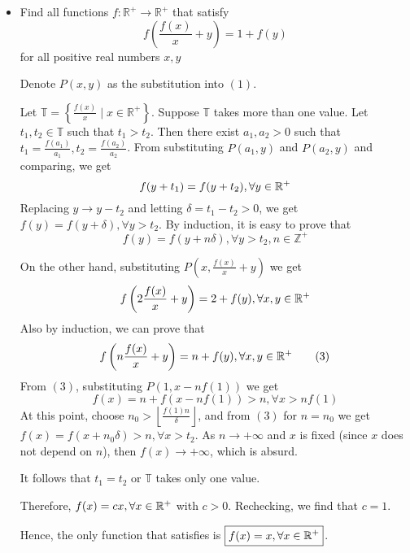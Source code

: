 \documentclass[11pt]{scrartcl}
\begin{document}
\begin{itemize}[label=, leftmargin=0em, itemsep=0.2em]
\begin{sol}
    \end{sol}
    
    \item \begin{bt}
        Find all functions $f: \mathbb{R^+} \to \mathbb{R^+}$ that satisfy
        \[
        f\left(\frac{f(x)}{x}+y\right)=1+f(y) \tag{1}
        \]
        for all positive real numbers $x,y$
    \end{bt}
    
    \begin{sol}
        Denote $P(x,y)$ as the substitution into $(1)$.


        Let $\mathbb{T} = \left\{\frac{f(x)}{x} \mid x \in \mathbb{R^+}\right\}$. Suppose $\mathbb{T}$ takes more than one value. Let $t_1, t_2 \in \mathbb{T}$ such that $t_1 > t_2$. Then there exist $a_1, a_2 > 0$ such that $t_1 = \frac{f(a_1)}{a_1}, t_2 = \frac{f(a_2)}{a_2}$. From substituting $P(a_1,y)$ and $P(a_2,y)$ and comparing, we get 
        \[
            f(y + t_1) = f(y + t_2), \forall y\in \mathbb{R^+}
        \]
        Replacing $y \to y - t_2$ and letting $\delta = t_1 - t_2 > 0$, we get $f(y) = f(y + \delta), \forall y > t_2$. By induction, it is easy to prove that 
        \[f(y) = f(y + n\delta), \forall y > t_2, n \in \mathbb{Z^+} \tag{2}\]
        
        On the other hand, substituting $P(x, \frac{f(x)}{x} + y)$ we get 
        \[
            f\left(2\frac{f(x)}{x}+y\right)=2+f(y), \xyro
        \]
        Also by induction, we can prove that 
        \[
            f\left(n\frac{f(x)}{x}+y\right)=n+f(y), \xyro \tag{3}
        \]
        From $(3)$, substituting $P(1,x - nf(1))$ we get 
        \[
            f(x) = n + f(x - nf(1)) > n ,\forall x > nf(1)
        \]
        At this point, choose $n_0 > \left\lfloor \frac{f(1)n}{\delta} \right\rfloor$, and from $(3)$ for $n = n_0$ we get $f(x) = f(x + n_0\delta) > n, \forall x > t_2$. As $n \to +\infty$ and $x$ is fixed (since $x$ does not depend on $n$), then $f(x) \to +\infty$, which is absurd. 

        It follows that $t_1 = t_2$ or $\mathbb{T}$ takes only one value.

        Therefore, $f(x) = cx, \forall x\in \mathbb{R^+}$ with $c > 0$. Rechecking, we find that $c = 1$. 

        Hence, the only function that satisfies is $\boxed{f(x) = x, \forall x\in \mathbb{R^+}}$.

        

\end{sol}
\end{itemize}
\end{document}
